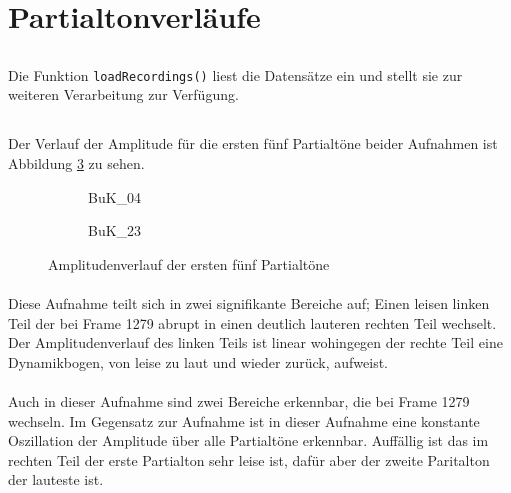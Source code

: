 \section{Partialtonverläufe}
\label{sec:1}

\subsection{}
Die Funktion \texttt{loadRecordings()} liest die Datensätze ein und stellt sie zur weiteren Verarbeitung zur Verfügung.

\subsection{}
Der Verlauf der Amplitude für die ersten fünf Partialtöne beider Aufnahmen ist Abbildung \ref{fig:ampl} zu sehen.

\begin{figure}[tbh]
    \centering
    \begin{subfigure}{.5\textwidth}
        \centering
        \caption{BuK\_04}
        \scalebox{0.5}{}
        \label{fig:amp04}
    \end{subfigure}%
    \begin{subfigure}{.5\textwidth}
        \centering
        \caption{BuK\_23}
        \scalebox{0.5}{}
        \label{fig:amp23}
    \end{subfigure}
    \caption{Amplitudenverlauf der ersten fünf Partialtöne}
    \label{fig:ampl}
\end{figure}

\paragraph{}
Diese Aufnahme teilt sich in zwei signifikante Bereiche auf;
Einen leisen linken Teil der bei Frame 1279 abrupt in einen deutlich lauteren rechten Teil wechselt.
Der Amplitudenverlauf des linken Teils ist linear wohingegen der rechte Teil eine Dynamikbogen, von leise zu laut und wieder zurück, aufweist.

\paragraph{}
Auch in dieser Aufnahme sind zwei Bereiche erkennbar, die bei Frame 1279 wechseln.
Im Gegensatz zur Aufnahme  ist in dieser Aufnahme eine konstante Oszillation der Amplitude über alle Partialtöne erkennbar.
Auffällig ist das im rechten Teil der erste Partialton sehr leise ist, dafür aber der zweite Paritalton der lauteste ist.


